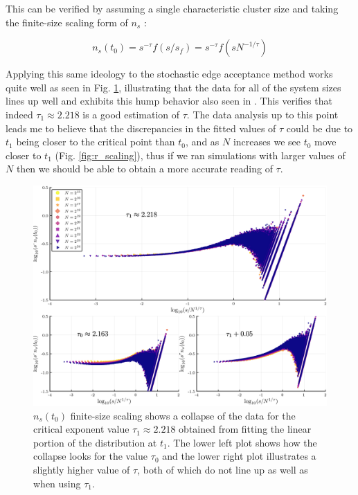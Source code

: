 This can be verified by assuming a single characteristic cluster size and taking the finite-size scaling form of $n_s$ \cite{Lee_1}:

\begin{equation}
	n_s(t_0) = s^{-\tau} f(s / s_f) = s^{-\tau} f(s N^{-1 / \tau})
\end{equation}

Applying this same ideology to the stochastic edge acceptance method works quite well as seen in Fig. \ref{fig:fss_collapse_triple}, illustrating that the data for all of the system sizes lines up well and exhibits this hump behavior also seen in \cite{Lee_1}.
This verifies that indeed $\tau_1 \approx 2.218$ is a good estimation of $\tau$.
The data analysis up to this point leads me to believe that the discrepancies in the fitted values of $\tau$ could be due to $t_1$ being closer to the critical point than $t_0$, and as $N$ increases we see $t_0$ move closer to $t_1$ (Fig. \ref{fig:r_scaling}), thus if we ran simulations with larger values of $N$ then we should be able to obtain a more accurate reading of $\tau$.

\begin{figure}[H]
	\centering
	\includegraphics[width=350pt, clip]{images/fss_collapse_triple.png}
	\caption{$n_s(t_0)$ finite-size scaling shows a collapse of the data for the critical exponent value $\tau_1 \approx 2.218$ obtained from fitting the linear portion of the distribution at $t_1$. The lower left plot shows how the collapse looks for the value $\tau_0$ and the lower right plot illustrates a slightly higher value of $\tau$, both of which do not line up as well as when using $\tau_1$.}
	\label{fig:fss_collapse_triple}
\end{figure}

